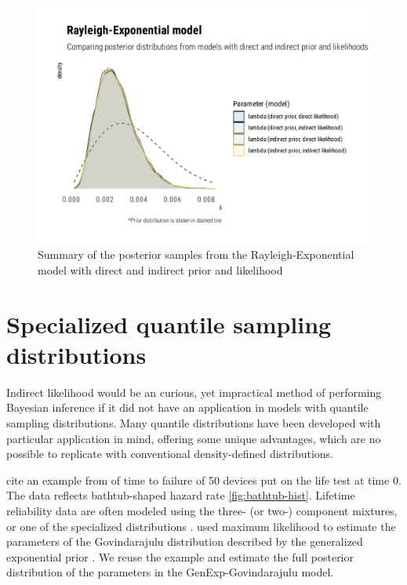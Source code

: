 \documentclass[
  12pt,
]{article}
\begin{document}
\begin{figure}

{\centering \includegraphics[width=0.5\linewidth]{ilbm_article_files/figure-latex/rexp-prior-lik-graphs-1} 

}

\caption{Summary of the posterior samples from the Rayleigh-Exponential model with direct and indirect prior and likelihood}\label{fig:rexp-prior-lik-graphs}
\end{figure}

\hypertarget{specialized-quantile-sampling-distributions}{%
\section{Specialized quantile sampling distributions}\label{specialized-quantile-sampling-distributions}}

Indirect likelihood would be an curious, yet impractical method of performing Bayesian inference if it did not have an application in models with quantile sampling distributions. Many quantile distributions have been developed with particular application in mind, offering some unique advantages, which are no possible to replicate with conventional density-defined distributions.

\citet{nair2020BayesianInferenceQuantile} cite an example from \citet{aarset1987HowIdentifyBathtub} of time to failure of 50 devices put on the life test at time 0. The data reflects bathtub-shaped hazard rate \ref{fig:bathtub-hist}. Lifetime reliability data are often modeled using the three- (or two-) component mixtures, or one of the specialized distributions \citep{nadarajah2009BathtubshapedFailureRate}. \citet{nair2020BayesianInferenceQuantile} used maximum likelihood to estimate the parameters of the Govindarajulu distribution \citep{nair2012GovindarajuluDistributionProperties} described by the generalized exponential prior \citep{gupta2007GeneralizedExponentialDistribution}. We reuse the \citet{aarset1987HowIdentifyBathtub} example and estimate the full posterior distribution of the parameters in the GenExp-Govindarajulu model.
\end{document}
